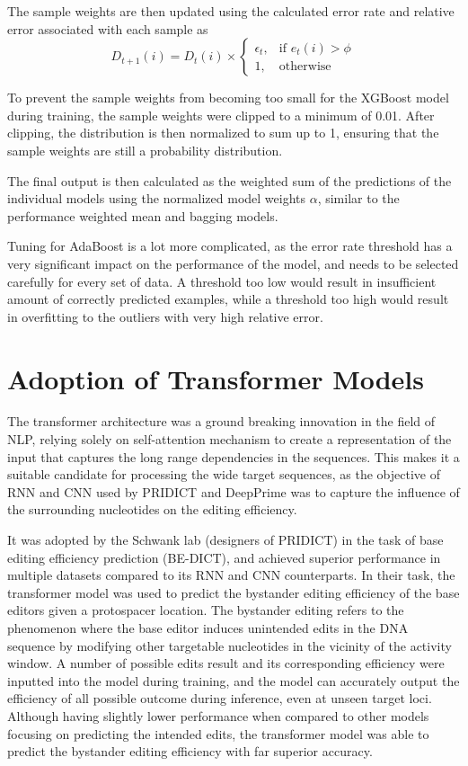 The sample weights are then updated using the calculated error rate and relative error associated with each sample as 
$$D_{t+1}(i) = D_t(i) \times \begin{cases}
    \epsilon_t, & \text{if } e_t(i) > \phi \\
    1, & \text{otherwise}
\end{cases}$$

To prevent the sample weights from becoming too small for the XGBoost model during training, the sample weights were clipped to a minimum of 0.01. After clipping, the distribution is then normalized to sum up to 1, ensuring that the sample weights are still a probability distribution.

The final output is then calculated as the weighted sum of the predictions of the individual models using the normalized model weights $\alpha$, similar to the performance weighted mean and bagging models.

Tuning for AdaBoost is a lot more complicated, as the error rate threshold has a very significant impact on the performance of the model, and needs to be selected carefully for every set of data. A threshold too low would result in insufficient amount of correctly predicted examples, while a threshold too high would result in overfitting to the outliers with very high relative error\cite{shresthaExperimentsAdaBoostRT2006}. 



\section{Adoption of Transformer Models}

The transformer architecture was a ground breaking innovation in the field of NLP, relying solely on self-attention mechanism to create a representation of the input that captures the long range dependencies in the sequences\cite{vaswaniAttentionAllYou2017}. This makes it a suitable candidate for processing the wide target sequences, as the objective of RNN and CNN used by PRIDICT and DeepPrime was to capture the influence of the surrounding nucleotides on the editing efficiency.

It was adopted by the Schwank lab (designers of PRIDICT) in the task of base editing efficiency prediction (BE-DICT), and achieved superior performance in multiple datasets compared to its RNN and CNN counterparts\cite{marquartPredictingBaseEditing2021}. In their task, the transformer model was used to predict the bystander editing efficiency of the base editors given a protospacer location. The bystander editing refers to the phenomenon where the base editor induces unintended edits in the DNA sequence by modifying other targetable nucleotides in the vicinity of the activity window. A number of possible edits result and its corresponding efficiency were inputted into the model during training, and the model can accurately output the efficiency of all possible outcome during inference, even at unseen target loci. Although having slightly lower performance when compared to other models focusing on predicting the intended edits, the transformer model was able to predict the bystander editing efficiency with far superior accuracy.

